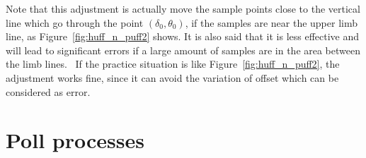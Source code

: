 

Note that this adjustment is actually move the sample points close to the
vertical line which go through the point $(\delta_0, \theta_0)$, if the samples
are near the upper limb line, as Figure~\ref{fig:huff_n_puff2} shows. It is
also said that it is less effective and will lead to significant errors if a
large amount of samples are in the area between the limb
lines.~\cite{huff_n_puff} If the practice situation is like
Figure~\ref{fig:huff_n_puff2}, the adjustment works fine, since it can
avoid the variation of offset which can be considered as error.


\section{Poll processes}%
\label{sec:poll_processes}


